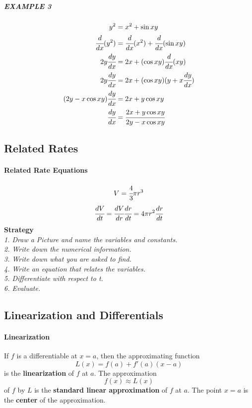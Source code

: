 \documentclass{article}
\begin{document}
                \subparagraph{EXAMPLE 3}
                    \begin{equation}
                        \begin{aligned}
                            y^2&=x^2+\sin xy\\
                            \cfrac{d}{dx}(y^2)&=\cfrac{d}{dx}(x^2)+\cfrac{d}{dx}(\sin xy)\\
                            2y\cfrac{dy}{dx}&=2x+(\cos xy)\cfrac{d}{dx}(xy)\\
                            2y\cfrac{dy}{dx}&=2x+(\cos xy)(y+x\cfrac{dy}{dx})\\
                            (2y-x\cos xy)\cfrac{dy}{dx}&=2x+y\cos xy\\
                            \cfrac{dy}{dx}&=\cfrac{2x+y\cos xy}{2y-x\cos xy}
                        \end{aligned}
                    \end{equation}
        \subsection{Related Rates}
            \paragraph{Related Rate Equations}
                \[V=\cfrac{4}{3}\pi r^3\]
                \[\cfrac{dV}{dt}=\cfrac{dV}{dr}\cfrac{dr}{dt}=4\pi r^2\cfrac{dr}{dt}\]
            \textbf{Strategy}\\
                \textit{1. Draw a Picture and name the variables and constants.}\\
                \textit{2. Write down the numerical information.}\\
                \textit{3. Write down what you are asked to find.}\\
                \textit{4. Write an equation that relates the variables.}\\
                \textit{5. Differentiate with respect to t.}\\
                \textit{6. Evaluate.}\\
        \subsection{Linearization and Differentials}
            \paragraph{Linearization} If $f$ is a differentiable at $x=a$, then the approximating function
            \[L(x)=f(a)+f'(a)(x-a)\]
            is the \textbf{linearization} of $f$ at $a$. The approximation
            \[f(x)\approx L(x)\]
            of $f$ by $L$ is the \textbf{standard linear approximation} of $f$ at $a$. The point $x=a$ is the \textbf{center} of the approximation.
\end{document}
